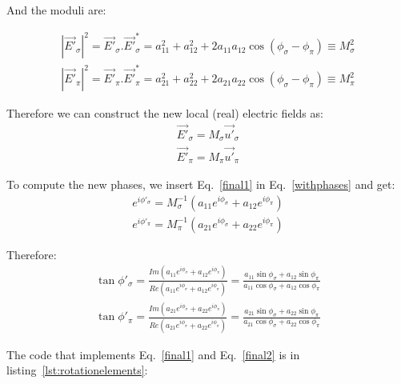\documentclass{iucr}
\begin{document}
And the moduli are: 

\begin{eqnarray}
|\vec{E'}_\sigma|^2 = \vec{E'}_\sigma . \vec{E'}_\sigma^*  = 
a_{11}^2 + a_{12}^2 + 2 a_{11} a_{12} \cos(\phi_\sigma-\phi_\pi) \equiv
M_\sigma^2 \nonumber \\ 
|\vec{E'}_\pi|^2    = \vec{E'}_\pi    . \vec{E'}_\pi^*     = 
a_{21}^2 + a_{22}^2 + 2 a_{21} a_{22} \cos(\phi_\sigma-\phi_\pi) \equiv
M_\pi^2
\end{eqnarray}

Therefore we can construct the new local (real) electric fields as: 
\begin{eqnarray}
\label{final1}
\vec{E'}_\sigma = M_\sigma \vec{u'}_\sigma  \nonumber \\ 
\vec{E'}_\pi = M_\pi \vec{u'}_\pi  
\end{eqnarray}

To compute the new phases, we insert Eq.~\ref{final1} in Eq.~\ref{withphases} and get: 
\begin{eqnarray}
e^{i \phi'_\sigma} = M_\sigma^{-1} (a_{11} e^{i \phi_\sigma} + a_{12} e^{i \phi_\pi})  \nonumber \\ 
e^{i \phi'_\pi} =  M_\pi^{-1}      (a_{21} e^{i \phi_\sigma} + a_{22} e^{i \phi_\pi}) 
\end{eqnarray}

Therefore:
\begin{eqnarray}
\label{final2}
\tan{\phi'_\sigma} = \frac{Im(a_{11} e^{i \phi_\sigma} + a_{12} e^{i \phi_\pi})}
                          {Re(a_{11} e^{i \phi_\sigma} + a_{12} e^{i \phi_\pi})} = 
                          \frac{a_{11} \sin{\phi_\sigma} + a_{12} \sin{\phi_\pi}}
                               {a_{11} \cos{\phi_\sigma} + a_{12} \cos{\phi_\pi}}  \nonumber \\ 
\tan{\phi'_\pi} =  \frac{Im(a_{21} e^{i \phi_\sigma} + a_{22} e^{i \phi_\pi})}
                        {Re(a_{21} e^{i \phi_\sigma} + a_{22} e^{i \phi_\pi})} = 
                        \frac{a_{21} \sin{\phi_\sigma} + a_{22} \sin{\phi_\pi}}
                             {a_{21} \cos{\phi_\sigma} + a_{22} \cos{\phi_\pi}}
\end{eqnarray}


The code that implements Eq.~\ref{final1} and Eq.~\ref{final2} is in listing~\ref{lst:rotationelements}: 
\end{document}

